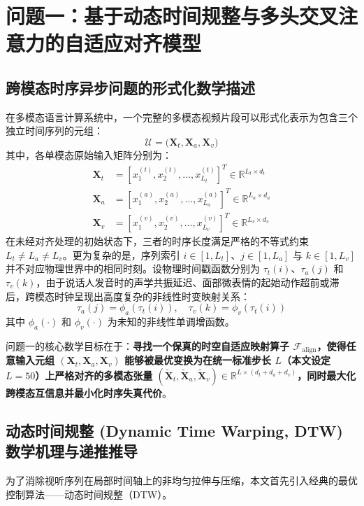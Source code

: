 \section{问题一：基于动态时间规整与多头交叉注意力的自适应对齐模型}

\subsection{跨模态时序异步问题的形式化数学描述}
在多模态语言计算系统中，一个完整的多模态视频片段可以形式化表示为包含三个独立时间序列的元组：
\begin{equation}
\mathcal{U} = \big( \mathbf{X}_t, \mathbf{X}_a, \mathbf{X}_v \big)
\end{equation}
其中，各单模态原始输入矩阵分别为：
\begin{align}
\mathbf{X}_t &= [x_1^{(t)}, x_2^{(t)}, \dots, x_{L_t}^{(t)}]^T \in \mathbb{R}^{L_t \times d_t} \\
\mathbf{X}_a &= [x_1^{(a)}, x_2^{(a)}, \dots, x_{L_a}^{(a)}]^T \in \mathbb{R}^{L_a \times d_a} \\
\mathbf{X}_v &= [x_1^{(v)}, x_2^{(v)}, \dots, x_{L_v}^{(v)}]^T \in \mathbb{R}^{L_v \times d_v}
\end{align}
在未经对齐处理的初始状态下，三者的时序长度满足严格的不等式约束 $L_t \ne L_a \ne L_v$。更为复杂的是，序列索引 $i \in [1, L_t]$、$j \in [1, L_a]$ 与 $k \in [1, L_v]$ 并不对应物理世界中的相同时刻。设物理时间戳函数分别为 $\tau_t(i)$、$\tau_a(j)$ 和 $\tau_v(k)$，由于说话人发音时的声学共振延迟、面部微表情的起始动作超前或滞后，跨模态时钟呈现出高度复杂的非线性时变映射关系：
\begin{equation}
\tau_a(j) = \phi_a(\tau_t(i)), \quad \tau_v(k) = \phi_v(\tau_t(i))
\end{equation}
其中 $\phi_a(\cdot)$ 和 $\phi_v(\cdot)$ 为未知的非线性单调增函数。

问题一的核心数学目标在于：\textbf{寻找一个保真的时空自适应映射算子 $\mathcal{F}_{\text{align}}$，使得任意输入元组 $(\mathbf{X}_t, \mathbf{X}_a, \mathbf{X}_v)$ 能够被最优变换为在统一标准步长 $L$（本文设定 $L=50$）上严格对齐的多模态张量 $(\tilde{\mathbf{X}}_t, \tilde{\mathbf{X}}_a, \tilde{\mathbf{X}}_v) \in \mathbb{R}^{L \times (d_t + d_a + d_v)}$，同时最大化跨模态互信息并最小化时序失真代价}。

\subsection{动态时间规整 (Dynamic Time Warping, DTW) 数学机理与递推推导}
为了消除视听序列在局部时间轴上的非均匀拉伸与压缩，本文首先引入经典的最优控制算法——动态时间规整（DTW）\cite{berndt1994using}。

